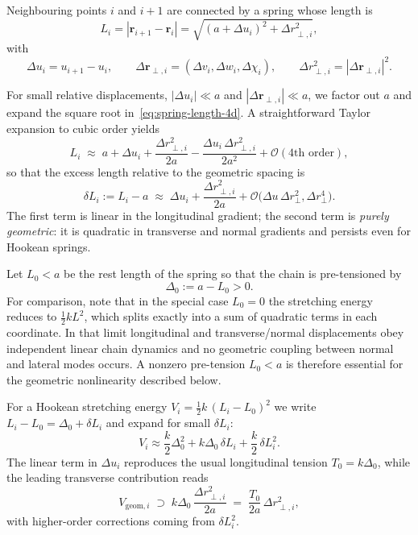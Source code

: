 Neighbouring points $i$ and $i+1$ are connected by a spring whose length is
\begin{equation}
  L_i = |\mathbf r_{i+1} - \mathbf r_i|
      = \sqrt{(a + \Delta u_i)^2 + \Delta r_{\perp,i}^2},
  \label{eq:spring-length-4d}
\end{equation}
with
\[
  \Delta u_i = u_{i+1}-u_i,
  \qquad
  \Delta\mathbf r_{\perp,i} = (\Delta v_i,\Delta w_i,\Delta\chi_i),
  \qquad
  \Delta r_{\perp,i}^2 = |\Delta\mathbf r_{\perp,i}|^2.
\]

For small relative displacements, $|\Delta u_i| \ll a$ and
$|\Delta\mathbf r_{\perp,i}|\ll a$, we factor out $a$ and expand the square
root in~\eqref{eq:spring-length-4d}. A straightforward Taylor expansion
to cubic order yields
\begin{equation}
  L_i \;\approx\;
  a
  + \Delta u_i
  + \frac{\Delta r_{\perp,i}^2}{2a}
  - \frac{\Delta u_i\,\Delta r_{\perp,i}^2}{2a^2}
  + \mathcal O(\text{4th order}),
  \label{eq:length-expansion}
\end{equation}
so that the excess length relative to the geometric spacing is
\begin{equation}
  \delta L_i := L_i - a
  \;\approx\;
  \Delta u_i
  + \frac{\Delta r_{\perp,i}^2}{2a}
  + \mathcal O\!\bigl(\Delta u\,\Delta r_{\perp}^2,\Delta r_{\perp}^4\bigr).
  \label{eq:deltaL-geometric}
\end{equation}
The first term is linear in the longitudinal gradient; the second term is
\emph{purely geometric}: it is quadratic in transverse and normal gradients and
persists even for Hookean springs.

Let $L_0 < a$ be the rest length of the spring so that the chain is
pre-tensioned by
\[
  \Delta_0 := a - L_0 > 0.
\]
For comparison, note that in the special case $L_0 = 0$ the stretching
energy reduces to $\tfrac{1}{2}kL^2$, which splits exactly into a sum of
quadratic terms in each coordinate. In that limit longitudinal and
transverse/normal displacements obey independent linear chain dynamics and
no geometric coupling between normal and lateral modes occurs. A nonzero
pre-tension $L_0<a$ is therefore essential for the geometric nonlinearity
described below.

For a Hookean stretching energy
\(
  V_i = \tfrac{1}{2}k\,(L_i - L_0)^2
\)
we write $L_i - L_0 = \Delta_0 + \delta L_i$ and expand for small
$\delta L_i$:
\begin{equation}
  V_i \approx
  \frac{k}{2}\Delta_0^2
  + k\Delta_0\,\delta L_i
  + \frac{k}{2}\,\delta L_i^2.
\end{equation}
The linear term in $\Delta u_i$ reproduces the usual longitudinal tension
$T_0 = k\Delta_0$, while the leading transverse contribution reads
\begin{equation}
  V_{\text{geom},i}
  \;\supset\;
  k\Delta_0\,\frac{\Delta r_{\perp,i}^2}{2a}
  \;=\;
  \frac{T_0}{2a}\,\Delta r_{\perp,i}^2,
  \label{eq:geom-energy-edge}
\end{equation}
with higher-order corrections coming from $\delta L_i^2$.

